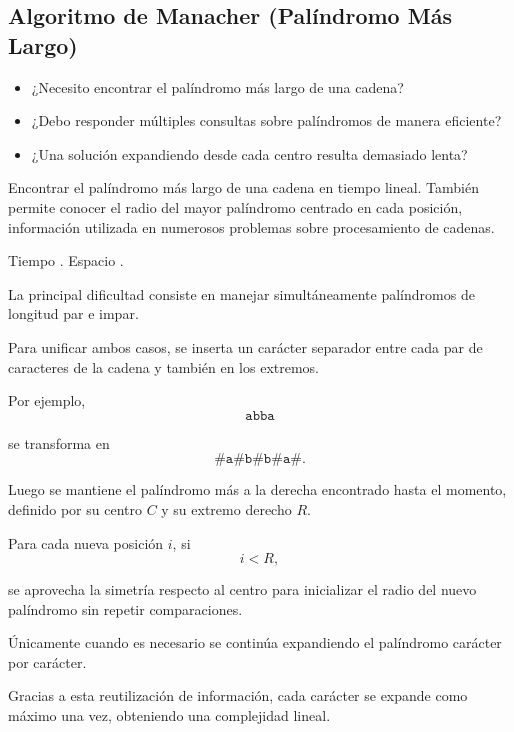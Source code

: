 \subsection{Algoritmo de Manacher (Palíndromo Más Largo)}


\begin{itemize}
\item ¿Necesito encontrar el palíndromo más largo de una cadena?
\item ¿Debo responder múltiples consultas sobre palíndromos de manera eficiente?
\item ¿Una solución  expandiendo desde cada centro resulta demasiado lenta?
\end{itemize}


Encontrar el palíndromo más largo de una cadena en tiempo lineal. También permite conocer el radio del mayor palíndromo centrado en cada posición, información utilizada en numerosos problemas sobre procesamiento de cadenas.


Tiempo . Espacio .


La principal dificultad consiste en manejar simultáneamente palíndromos de longitud par e impar.

Para unificar ambos casos, se inserta un carácter separador entre cada par de caracteres de la cadena y también en los extremos.

Por ejemplo,
\[
\texttt{abba}
\]

se transforma en
\[
\texttt{\#a\#b\#b\#a\#}.
\]

Luego se mantiene el palíndromo más a la derecha encontrado hasta el momento, definido por su centro \(C\) y su extremo derecho \(R\).

Para cada nueva posición \(i\), si
\[
i<R,
\]

se aprovecha la simetría respecto al centro para inicializar el radio del nuevo palíndromo sin repetir comparaciones.

Únicamente cuando es necesario se continúa expandiendo el palíndromo carácter por carácter.

Gracias a esta reutilización de información, cada carácter se expande como máximo una vez, obteniendo una complejidad lineal.


